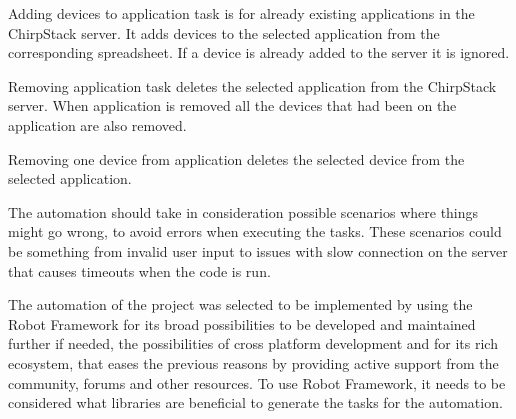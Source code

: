 Adding devices to application task is for already existing applications in the ChirpStack server.
It adds devices to the selected application from the corresponding spreadsheet.
If a device is already added to the server it is ignored.

Removing application task deletes the selected application from the ChirpStack server.
When application is removed all the devices that had been on the application are also removed.

Removing one device from application deletes the selected device from the selected application.

The automation should take in consideration possible scenarios where things might go wrong, to avoid errors when executing the tasks.
These scenarios could be something from invalid user input to issues with slow connection on the server that causes timeouts when the code is run.

The automation of the  project was selected to be implemented by using the Robot Framework for its broad possibilities to be developed and maintained further if needed, the possibilities of cross platform development and for its rich ecosystem, that eases the previous reasons by providing active support from the community, forums and other resources.
To use Robot Framework, it needs to be considered what libraries are beneficial to generate the tasks for the automation.


\clearpage %

